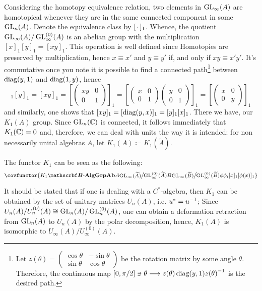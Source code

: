 Considering the homotopy equivalence relation, two elements in $\operatorname{GL}_\infty(A)$ are homotopical whenever they are in the same connected component in some $\operatorname{GL}_n(A)$. Denote the equivalence class by $[\operatorname{\,\cdot\,}]_1$. Whence, the quotient $\operatorname{GL}_\infty(A)/\operatorname{GL}_\infty^{(0)}(A)$ is an abelian group with the multiplication $[x]_1[y]_1 = [xy]_1$. This operation is well defined since Homotopies are preserved by multiplication, hence $x \equiv x'$ and $y\equiv y'$ if, and only if $xy\equiv x'y'$. It's commutative once you note it is possible to find a connected path\footnote{Let $z(\theta) = \left(\begin{smallmatrix}\cos \theta & -\sin \theta \\ \sin \theta & \cos \theta \end{smallmatrix}\right)$ be the rotation matrix by some angle $\theta$. Therefore, the continuous map $[0,\pi/2] \ni \theta \longrightarrow z(\theta) \operatorname{diag}(y,1) {z(\theta)}^{-1}$ is the desired path. } between $\operatorname{diag}(y,1)$ and $\operatorname{diag}(1,y)$, hence 
    \begin{equation*}
        [x]_1[y]_1 = [xy]_1 = \left[\begin{pmatrix}
            xy & 0 \\ 0 & 1
        \end{pmatrix}\right]_1= \left[\begin{pmatrix}
            x & 0 \\ 0 & 1
        \end{pmatrix}\begin{pmatrix}
            y & 0 \\ 0 & 1
        \end{pmatrix}\right]_1 = \left[\begin{pmatrix}
            x & 0 \\ 0 & y
        \end{pmatrix}\right]_1 
    \end{equation*}    
    and similarly, one shows that $[xy]_1 = [\operatorname{diag}(y,x)]_1 = [y]_1[x]_1$. There we have, our $K_1(A)$ group. Since $\operatorname{GL}_n(\operatorname{\mathbb{C}})$ is connected, it follows immediately that $K_1(\operatorname{\mathbb{C}}) = 0$ and, therefore, we can deal with units the way it is intended: for non necessarily unital algebras $A$, let $K_1(A) \coloneqq K_1(\widetilde{A})$.

\begin{definicao}
    The functor $K_1$ can be seen as the following:
    \begin{equation*}
        \covfunctor{{K_1}{\BAlg}{\Ab{\Grp}}{A}{\mfrac{\GL_\infty(\widetilde A)}{\GL_\infty^{(0)}(\widetilde A)}}{B}{\mfrac{\GL_\infty(\widetilde B)}{\GL_\infty^{(0)}(\widetilde B)}}{\phi}{\sub\phi1}{[x]_1}{[\phi(x)]_1}}
    \end{equation*}
\end{definicao}

\begin{observacao}
    It should be stated that if one is dealing with a $C^*$-algebra, then $K_1$ can be obtained by the set of unitary matrices $U_n(A)$, i.e. $u^* = {u}^{-1}$; Since $U_n(A)/U_n^{(0)}(A) \cong \operatorname{GL}_n(A)/\operatorname{GL}_n^{(0)}(A)$, one can obtain a deformation retraction from $\operatorname{GL}_n(A)$ to $U_n(A)$ by the polar decomposition, hence, $K_1(A)$ is isomorphic to $U_\infty(A)/U_\infty^{(0)}(A)$.  
\end{observacao}